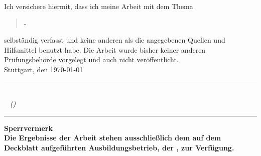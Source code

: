 Ich versichere hiermit, dass ich meine Arbeit mit dem Thema
\begin{quote}
\textit{\titel} -\textit{ \untertitel }
\end{quote}
selbständig verfasst und keine anderen als die angegebenen Quellen und Hilfsmittel benutzt habe. Die Arbeit wurde bisher keiner anderen Prüfungsbehörde vorgelegt und auch nicht veröffentlicht.  \\[10ex]




Stuttgart, den \today \\[4ex]

\rule[0.2cm]{8cm}{0.5pt} \\
\textsc{\autor} ~ \textit{ (\matrikelnr)} \\[10ex]

\hrule 
\vspace*{1.0cm}
\noindent \textbf{\Large{Sperrvermerk}}\\
\normalsize
\textbf{Die Ergebnisse der Arbeit stehen ausschließlich dem auf dem Deckblatt aufgeführten Ausbildungsbetrieb, der \firma , zur Verfügung.}